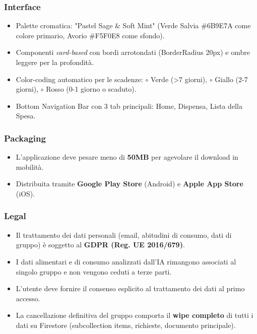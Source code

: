 \documentclass[12pt,a4paper]{article}
\begin{document}
\subsubsection{Interface}
\begin{itemize}
    \item Palette cromatica: "Pastel Sage \& Soft Mint" (Verde Salvia \#6B9E7A come colore primario, Avorio \#F5F0E8 come sfondo).
    \item Componenti \textit{card-based} con bordi arrotondati (BorderRadius 20px) e ombre leggere per la profondità.
    \item Color-coding automatico per le scadenze: $\circ$ Verde (>7 giorni), $\circ$ Giallo (2-7 giorni), $\circ$ Rosso (0-1 giorno o scaduto).
    \item Bottom Navigation Bar con 3 tab principali: Home, Dispensa, Lista della Spesa.
\end{itemize}

\subsubsection{Packaging}
\begin{itemize}
    \item L'applicazione deve pesare meno di \textbf{50MB} per agevolare il download in mobilità.
    \item Distribuita tramite \textbf{Google Play Store} (Android) e \textbf{Apple App Store} (iOS).
\end{itemize}

\subsubsection{Legal}
\begin{itemize}
    \item Il trattamento dei dati personali (email, abitudini di consumo, dati di gruppo) è soggetto al \textbf{GDPR (Reg. UE 2016/679)}.
    \item I dati alimentari e di consumo analizzati dall'IA rimangono associati al singolo gruppo e non vengono ceduti a terze parti.
    \item L'utente deve fornire il consenso esplicito al trattamento dei dati al primo accesso.
    \item La cancellazione definitiva del gruppo comporta il \textbf{wipe completo} di tutti i dati su Firestore (subcollection items, richieste, documento principale).
\end{itemize}
\end{document}
